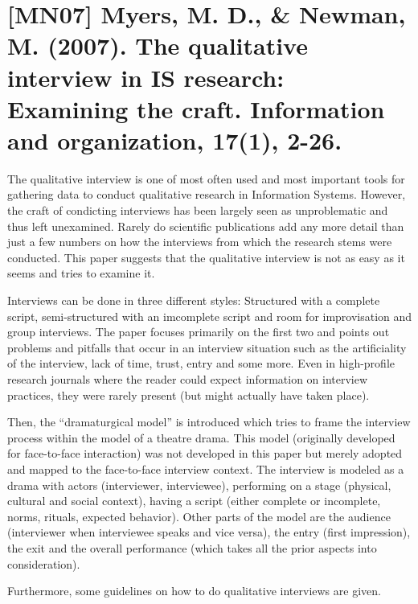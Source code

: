 \documentclass[a4paper,11pt,english]{scrartcl}
\newcommand{\papertitle}[2]{
	\section{[#1] #2}
}
\begin{document}
\pagestyle{fancy} %

\papertitle{MN07}{Myers, M. D., \& Newman, M. (2007). The qualitative interview in IS research: Examining the craft. Information and organization, 17(1), 2-26.}
The qualitative interview is one of most often used and most important tools for gathering data to conduct qualitative research in Information Systems. However, the craft of condicting interviews has been largely seen as unproblematic and thus left unexamined. Rarely do scientific publications add any more detail than just a few numbers on how the interviews from which the research stems were conducted. This paper suggests that the qualitative interview is not as easy as it seems and tries to examine it.

Interviews can be done in three different styles: Structured with a complete script, semi-structured with an imcomplete script and room for improvisation and group interviews. The paper focuses primarily on the first two and points out problems and pitfalls that occur in an interview situation such as the artificiality of the interview, lack of time, trust, entry and some more. Even in high-profile research journals where the reader could expect information on interview practices, they were rarely present (but might actually have taken place).

Then, the \enquote{dramaturgical model} is introduced which tries to frame the interview process within the model of a theatre drama. This model (originally developed for face-to-face interaction) was not developed in this paper but merely adopted and mapped to the face-to-face interview context. The interview is modeled as a drama with actors (interviewer, interviewee), performing on a stage (physical, cultural and social context), having a script (either complete or incomplete, norms, rituals, expected behavior). Other parts of the model are the audience (interviewer when interviewee speaks and vice versa), the entry (first impression), the exit and the overall performance (which takes all the prior aspects into consideration).

Furthermore, some guidelines on how to do qualitative interviews are given.
\end{document}
